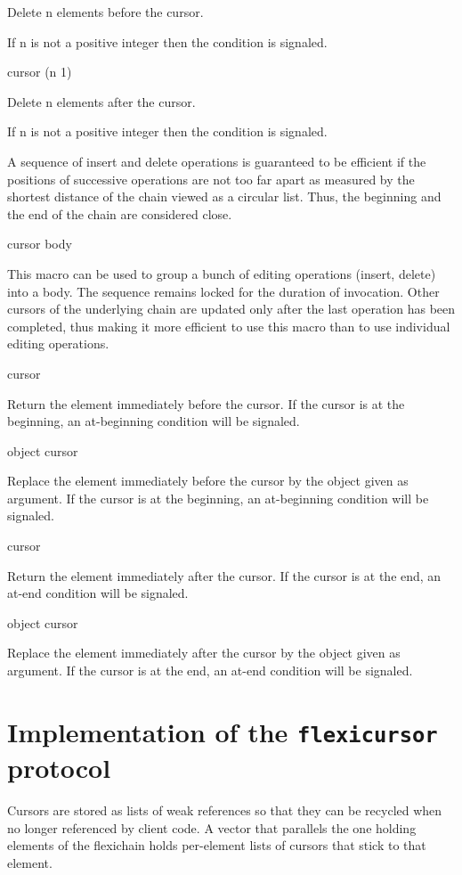 \documentclass[11pt]{article}
\begin{document}
Delete n elements before the cursor.

If n is not a positive integer then the  condition is signaled.

 {cursor \optional (n 1)}

Delete n elements after the cursor.

If n is not a positive integer then the  condition is signaled.

A sequence of insert and delete operations is guaranteed to be
efficient if the positions of successive operations are not too far
apart as measured by the shortest distance of the chain viewed as a
circular list.  Thus, the beginning and the end of the chain are
considered close.

 {cursor \body body}

This macro can be used to group a bunch of editing operations (insert,
delete) into a body.  The sequence remains locked for the duration of
invocation.  Other cursors of the underlying chain are updated only
after the last operation has been completed, thus making it more
efficient to use this macro than to use individual editing operations.

 {cursor}

Return the element immediately before the cursor.  If the cursor is
at the beginning, an at-beginning condition will be signaled.

 {object cursor}

Replace the element immediately before the cursor by the object given
as argument.  If the cursor is at the beginning, an at-beginning
condition will be signaled.

 {cursor}

Return the element immediately after the cursor.  If the cursor is
at the end, an at-end condition will be signaled.

 {object cursor}

Replace the element immediately after the cursor by the object given
as argument.  If the cursor is at the end, an at-end condition will be
signaled.

\section{Implementation of the \texttt{flexicursor} protocol}

Cursors are stored as lists of weak references so that they can be
recycled when no longer referenced by client code.  A vector that
parallels the one holding elements of the flexichain holds per-element
lists of cursors that stick to that element.
\end{document}
